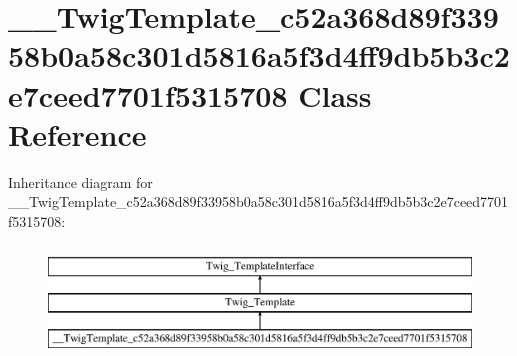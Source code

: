 \hypertarget{class_____twig_template__c52a368d89f33958b0a58c301d5816a5f3d4ff9db5b3c2e7ceed7701f5315708}{}\section{\+\_\+\+\_\+\+Twig\+Template\+\_\+c52a368d89f33958b0a58c301d5816a5f3d4ff9db5b3c2e7ceed7701f5315708 Class Reference}
\label{class_____twig_template__c52a368d89f33958b0a58c301d5816a5f3d4ff9db5b3c2e7ceed7701f5315708}
Inheritance diagram for \+\_\+\+\_\+\+Twig\+Template\+\_\+c52a368d89f33958b0a58c301d5816a5f3d4ff9db5b3c2e7ceed7701f5315708\+:\begin{figure}[H]
\begin{center}
\leavevmode
\includegraphics[height=3.000000cm]{class_____twig_template__c52a368d89f33958b0a58c301d5816a5f3d4ff9db5b3c2e7ceed7701f5315708}
\end{center}
\end{figure}
